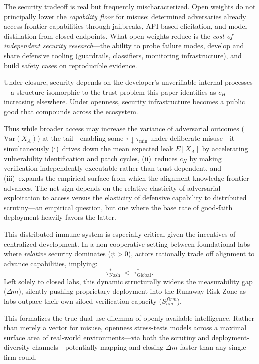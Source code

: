 \documentclass[12pt, letter]{article}
\begin{document}
The security tradeoff is real but frequently mischaracterized. Open weights do not principally lower the \emph{capability floor} for misuse: determined adversaries already access frontier capabilities through jailbreaks, API-based elicitation, and model distillation from closed endpoints. What open weights reduce is the \emph{cost of independent security research}---the ability to probe failure modes, develop and share defensive tooling (guardrails, classifiers, monitoring infrastructure), and build safety cases on reproducible evidence. 

Under closure, security depends on the developer's unverifiable internal processes---a structure isomorphic to the trust problem this paper identifies as $c_H$-increasing elsewhere. Under openness, security infrastructure becomes a public good that compounds across the ecosystem.

Thus while broader access may increase the variance of adversarial outcomes ($\mathrm{Var}(X_A)$) at the tail---enabling some $\tau\downarrow\tau_{\min}$ under deliberate misuse---it simultaneously (i)~drives down the mean expected leak $E[X_A]$ by accelerating vulnerability identification and patch cycles, (ii)~reduces $c_H$ by making verification independently executable rather than trust-dependent, and (iii)~expands the empirical surface from which the alignment knowledge frontier advances. The net sign depends on the relative elasticity of adversarial exploitation to access versus the elasticity of defensive capability to distributed scrutiny---an empirical question, but one where the base rate of good-faith deployment heavily favors the latter.

This distributed immune system is especially critical given the incentives of centralized development. In a non-cooperative setting between foundational labs where \emph{relative} security dominates ($\psi>0$), actors rationally trade off alignment to advance capabilities, implying:
\[
\tau^{\ast}_{\mathrm{Nash}} \;<\; \tau^{\ast}_{\mathrm{Global}}.
\]
Left solely to closed labs, this dynamic structurally widens the measurability gap ($\Delta m$), silently pushing proprietary deployment into the Runaway Risk Zone as labs outpace their own siloed verification capacity ($S_{nm}^{firm}$).

This formalizes the true dual-use dilemma of openly available intelligence. Rather than merely a vector for misuse, openness stress-tests models across a maximal surface area of real-world environments---via both the scrutiny and deployment-diversity channels---potentially mapping and closing $\Delta m$ faster than any single firm could. 
\end{document}
